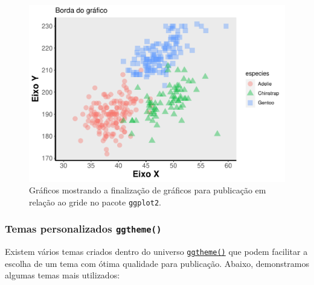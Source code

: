 \documentclass[
]{article}
\begin{document}
\begin{figure}
\centering
\includegraphics{epr_files/figure-latex/fig-plot-final-gride-4.pdf}
\caption{\label{fig:fig-plot-final-gride-4}Gráficos mostrando a finalização de gráficos para publicação em relação ao gride no pacote \texttt{ggplot2}.}
\end{figure}

\hypertarget{temas-personalizados-ggtheme}{%
\subsubsection{\texorpdfstring{Temas personalizados \texttt{ggtheme()}}{Temas personalizados ggtheme()}}\label{temas-personalizados-ggtheme}}

Existem vários temas criados dentro do universo \href{https://ggplot2.tidyverse.org/reference/ggtheme.html}{\texttt{ggtheme()}} que podem facilitar a escolha de um tema com ótima qualidade para publicação. Abaixo, demonstramos algumas temas mais utilizados:
\end{document}
